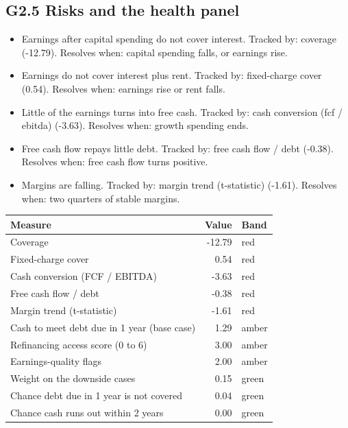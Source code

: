 \documentclass[11pt,a4paper]{article}
\begin{document}
\subsection*{G2.5 Risks and the health panel}
\begin{itemize}\item Earnings after capital spending do not cover interest. Tracked by: coverage (-12.79). Resolves when: capital spending falls, or earnings rise.\item Earnings do not cover interest plus rent. Tracked by: fixed-charge cover (0.54). Resolves when: earnings rise or rent falls.\item Little of the earnings turns into free cash. Tracked by: cash conversion (fcf / ebitda) (-3.63). Resolves when: growth spending ends.\item Free cash flow repays little debt. Tracked by: free cash flow / debt (-0.38). Resolves when: free cash flow turns positive.\item Margins are falling. Tracked by: margin trend (t-statistic) (-1.61). Resolves when: two quarters of stable margins.\end{itemize}
\begin{center}\footnotesize\setlength{\tabcolsep}{3.5pt}\begin{tabular}{@{}lrl@{}}\toprule
Measure & Value & Band \\\midrule
Coverage & -12.79 & \textcolor{bad}{red} \\
Fixed-charge cover & 0.54 & \textcolor{bad}{red} \\
Cash conversion (FCF / EBITDA) & -3.63 & \textcolor{bad}{red} \\
Free cash flow / debt & -0.38 & \textcolor{bad}{red} \\
Margin trend (t-statistic) & -1.61 & \textcolor{bad}{red} \\
Cash to meet debt due in 1 year (base case) & 1.29 & \textcolor{amber}{amber} \\
Refinancing access score (0 to 6) & 3.00 & \textcolor{amber}{amber} \\
Earnings-quality flags & 2.00 & \textcolor{amber}{amber} \\
Weight on the downside cases & 0.15 & \textcolor{good}{green} \\
Chance debt due in 1 year is not covered & 0.04 & \textcolor{good}{green} \\
Chance cash runs out within 2 years & 0.00 & \textcolor{good}{green} \\
\bottomrule\end{tabular}\end{center}
\end{document}
